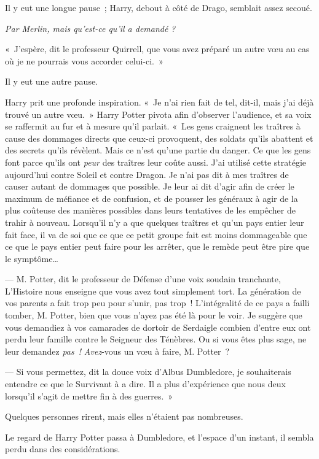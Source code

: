 Il y eut une longue pause~; Harry, debout à côté de Drago, semblait assez secoué.

\emph{Par Merlin, mais qu'est-ce qu'il a demandé} \emph{?}

«~J'espère, dit le professeur Quirrell, que vous avez préparé un autre vœu au cas où je ne pourrais vous accorder celui-ci.~»

Il y eut une autre pause.

Harry prit une profonde inspiration.
«~Je n'ai rien fait de tel, dit-il, mais j'ai déjà trouvé un autre vœu.~»
Harry Potter pivota afin d'observer l'audience, et sa voix se raffermit au fur et à mesure qu'il parlait.
«~Les gens craignent les traîtres à cause des dommages directs que ceux-ci provoquent, des soldats qu'ils abattent et des secrets qu'ils révèlent.
Mais ce n'est qu'une partie du danger.
Ce que les gens font parce qu'ils ont \emph{peur} des traîtres leur coûte aussi.
J'ai utilisé cette stratégie aujourd'hui contre Soleil et contre Dragon.
Je n'ai pas dit à mes traîtres de causer autant de dommages que possible.
Je leur ai dit d'agir afin de créer le maximum de méfiance et de confusion, et de pousser les généraux à agir de la plus coûteuse des manières possibles dans leurs tentatives de les empêcher de trahir à nouveau.
Lorsqu'il n'y a que quelques traîtres et qu'un pays entier leur fait face, il va de soi que ce que ce petit groupe fait est moins dommageable que ce que le pays entier peut faire pour les arrêter, que le remède peut être pire que le symptôme…

--- M. Potter, dit le professeur de Défense d'une voix soudain tranchante, L'Histoire nous enseigne que vous avez tout simplement tort.
La génération de vos parents a fait trop peu pour s'unir, pas trop~!
L'intégralité de ce pays a failli tomber, M. Potter, bien que vous n'ayez pas été là pour le voir.
Je suggère que vous demandiez à vos camarades de dortoir de Serdaigle combien d'entre eux ont perdu leur famille contre le Seigneur des Ténèbres.
Ou si vous êtes plus sage, ne leur demandez \emph{pas~!} \emph{Avez}-vous un vœu à faire, M. Potter~?

--- Si vous permettez, dit la douce voix d'Albus Dumbledore, je souhaiterais entendre ce que le Survivant à a dire.
Il a plus d'expérience que nous deux lorsqu'il s'agit de mettre fin à des guerres.~»

Quelques personnes rirent, mais elles n'étaient pas nombreuses.

Le regard de Harry Potter passa à Dumbledore, et l'espace d'un instant, il sembla perdu dans des considérations.

